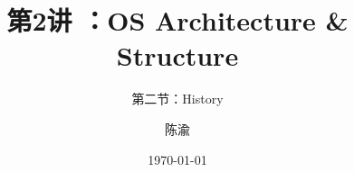 


\title[第1讲]{第2讲 ：OS Architecture \& Structure} %
\subtitle{第二节：History }
\author{陈渝} %
\date{\today} %




\begin{frame}
\titlepage %
\end{frame}

%
%

